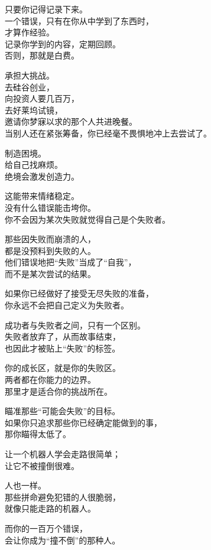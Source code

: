 \documentclass[
]{article}
\begin{document}
只要你记得记录下来。\\
一个错误，只有在你从中学到了东西时，\\
才算作经验。\\
记录你学到的内容，定期回顾。\\
否则，那就是白费。

承担大挑战。\\
去硅谷创业，\\
向投资人要几百万，\\
去好莱坞试镜，\\
邀请你梦寐以求的那个人共进晚餐。\\
当别人还在紧张筹备，你已经毫不畏惧地冲上去尝试了。

制造困境。\\
给自己找麻烦。\\
绝境会激发创造力。

这能带来情绪稳定。\\
没有什么错误能击垮你。\\
你不会因为某次失败就觉得自己是个失败者。

那些因失败而崩溃的人，\\
都是没预料到失败的人。\\
他们错误地把``失败''当成了``自我''，\\
而不是某次尝试的结果。

如果你已经做好了接受无尽失败的准备，\\
你永远不会把自己定义为失败者。

成功者与失败者之间，只有一个区别。\\
失败者放弃了，从而故事结束，\\
也因此才被贴上``失败''的标签。

你的成长区，就是你的失败区。\\
两者都在你能力的边界。\\
那里才是适合你的挑战所在。

瞄准那些``可能会失败''的目标。\\
如果你只追求那些你已经确定能做到的事，\\
那你瞄得太低了。

让一个机器人学会走路很简单；\\
让它不被撞倒很难。

人也一样。\\
那些拼命避免犯错的人很脆弱，\\
就像只能走路的机器人。

而你的一百万个错误，\\
会让你成为``撞不倒''的那种人。
\end{document}
